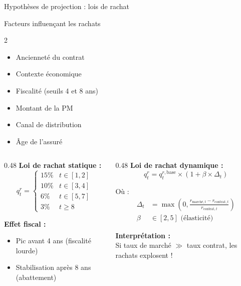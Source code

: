 \documentclass[10pt,aspectratio=169]{beamer}
\begin{document}
\begin{frame}{Hypothèses de projection : lois de rachat}
\begin{block}{Facteurs influençant les rachats}
\begin{multicols}{2}
\begin{itemize}
    \item Ancienneté du contrat
    \item Contexte économique
    \item Fiscalité (seuils 4 et 8 ans)
    \item Montant de la PM
    \item Canal de distribution
    \item Âge de l'assuré
\end{itemize}
\end{multicols}
\end{block}

\begin{columns}[T]
\begin{column}{0.48\textwidth}
\textbf{Loi de rachat statique :}
\[
q_t^r = 
\begin{cases}
15\% & t \in [1, 2] \\
10\% & t \in [3, 4] \\
6\% & t \in [5, 7] \\
3\% & t \geq 8
\end{cases}
\]

\textbf{Effet fiscal :}
\begin{itemize}
    \item Pic avant 4 ans (fiscalité lourde)
    \item Stabilisation après 8 ans (abattement)
\end{itemize}
\end{column}
\begin{column}{0.48\textwidth}
\textbf{Loi de rachat dynamique :}
\[
\boxed{q_t^r = q_t^{r,\text{base}} \times \left(1 + \beta \times \Delta_t\right)}
\]

Où :
\begin{align*}
\Delta_t &= \max\left(0, \frac{r_{\text{marché},t} - r_{\text{contrat},t}}{r_{\text{contrat},t}}\right) \\
\beta &\in [2, 5] \text{ (élasticité)}
\end{align*}

\textbf{Interprétation :}\\
Si taux de marché $\gg$ taux contrat, les rachats explosent !
\end{column}
\end{columns}
\end{frame}
\end{document}
